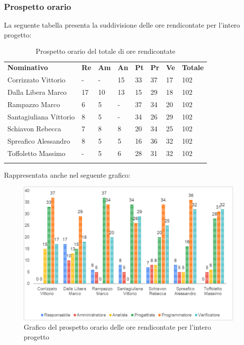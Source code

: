 \subsubsection{Prospetto orario}
La seguente tabella presenta la suddivisione delle ore rendicontate per l'intero progetto\glo:
\begin{longtable} {				
		>{}p{40mm}  
		>{}p{8mm}
		>{}p{8mm}
		>{}p{8mm}
		>{}p{8mm}
		>{}p{8mm}
		>{}p{8mm}
		>{}p{12mm}			
	}			
	\rowcolor{gray!50}
	\textbf{Nominativo} & \textbf{Re} & \textbf{Am} & \textbf{An} & \textbf{Pt} & \textbf{Pr} & \textbf{Ve} & \textbf{Totale}	\TBstrut \\ [2mm]
	Corrizzato Vittorio & - & - & 15 & 33 & 37 & 17 & 102 \TBstrut \\ [2mm]
	Dalla Libera Marco & 17 & 10 & 13 & 15 & 29 & 18 & 102 \TBstrut \\ [2mm]
	Rampazzo Marco & 6 & 5 & - & 37 & 34 & 20 & 102 \TBstrut \\ [2mm]
	Santagiuliana Vittorio & 8 & 5 & - & 34 & 26 & 29 & 102 \TBstrut \\ [2mm]
	Schiavon Rebecca & 7 & 8 & 8 & 20 & 34 & 25 & 102 \TBstrut \\ [2mm]
	Spreafico Alessandro & 8 & 5 & 5 & 16 & 36 & 32 & 102 \TBstrut \\ [2mm]
	Toffoletto Massimo & - & 5 & 6 & 28 & 31 & 32 & 102 \TBstrut \\ [2mm]
	\rowcolor{white}
	\caption{Prospetto orario del totale di ore rendicontate}
\end{longtable}
Rappresentata anche nel seguente grafico:
\begin{figure} [H]
	\includegraphics[width=\linewidth]{./img/Grafici/11.png}
	\caption{Grafico del prospetto orario delle ore rendicontate per l'intero progetto\glo}
\end{figure}
\pagebreak
